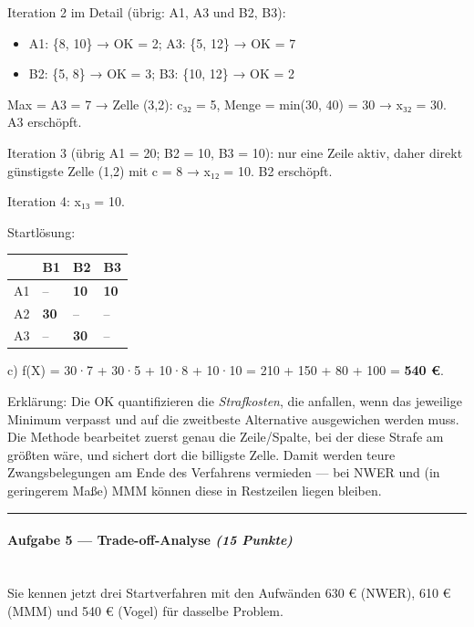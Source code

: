 \documentclass[11pt, a4paper]{article}
\begin{document}
Iteration 2 im Detail (übrig: A1, A3 und B2, B3):

\begin{itemize}
  \item A1: \{8, 10\} → OK = 2; A3: \{5, 12\} → OK = 7
  \item B2: \{5, 8\} → OK = 3; B3: \{10, 12\} → OK = 2
\end{itemize}

Max = A3 = 7 → Zelle (3,2): c₃₂ = 5, Menge = min(30, 40) = 30 → x₃₂ = 30. A3 erschöpft.


Iteration 3 (übrig A1 = 20; B2 = 10, B3 = 10): nur eine Zeile aktiv, daher direkt günstigste Zelle (1,2) mit c = 8 → x₁₂ = 10. B2 erschöpft.


Iteration 4: x₁₃ = 10.


Startlösung:



{\small
\begin{tabularx}{\linewidth}{XXXX}
\hline
\rowcolor{tableheadbg}
{\color{white}\textbf{}} & {\color{white}\textbf{B1}} & {\color{white}\textbf{B2}} & {\color{white}\textbf{B3}} \\[2pt]
\hline
\endhead
\hline
\endfoot
A1 & – & \textbf{10} & \textbf{10} \\
A2 & \textbf{30} & – & – \\
A3 & – & \textbf{30} & – \\
\end{tabularx}
}


c) f(X) = 30·7 + 30·5 + 10·8 + 10·10 = 210 + 150 + 80 + 100 = \textbf{540 €}.


Erklärung: Die OK quantifizieren die \textit{Strafkosten}, die anfallen, wenn das jeweilige Minimum verpasst und auf die zweitbeste Alternative ausgewichen werden muss. Die Methode bearbeitet zuerst genau die Zeile/Spalte, bei der diese Strafe am größten wäre, und sichert dort die billigste Zelle. Damit werden teure Zwangsbelegungen am Ende des Verfahrens vermieden — bei NWER und (in geringerem Maße) MMM können diese in Restzeilen liegen bleiben.



\noindent\textcolor{rulegray}{\rule{\linewidth}{0.4pt}}


\paragraph{Aufgabe 5 — Trade-off-Analyse \textit{(15 Punkte)}}\mbox{}\\[2pt]

Sie kennen jetzt drei Startverfahren mit den Aufwänden 630 € (NWER), 610 € (MMM) und 540 € (Vogel) für dasselbe Problem.
\end{document}
